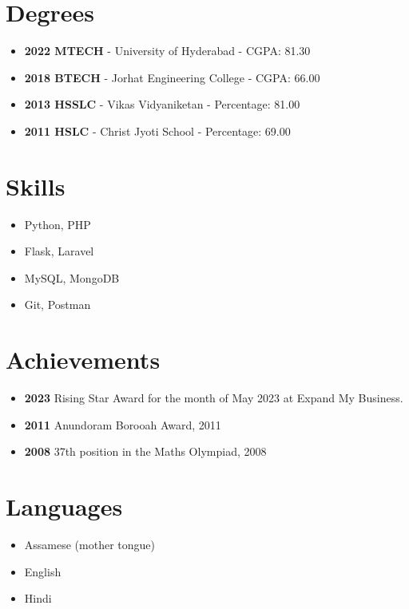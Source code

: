 \documentclass[10pt,a4paper]{article}
\begin{document}
\begin{paracol}{2}
\begin{leftcolumn}
\section*{Degrees}
\textcolor{textgrey}{
\begin{itemize}
    \item \textbf{2022 MTECH} - University of Hyderabad - CGPA: 81.30
    \item \textbf{2018 BTECH} - Jorhat Engineering College - CGPA: 66.00
    \item \textbf{2013 HSSLC} - Vikas Vidyaniketan - Percentage: 81.00
    \item \textbf{2011 HSLC} - Christ Jyoti School - Percentage: 69.00
\end{itemize}
}

\section*{Skills}
\textcolor{textgrey}{
\begin{itemize}
    \item Python, PHP
    \item Flask, Laravel
    \item MySQL, MongoDB
    \item Git, Postman
\end{itemize}
}

\section*{Achievements}
\textcolor{textgrey}{
\begin{itemize}
    \item \textbf{2023} Rising Star Award for the month of May 2023 at Expand My Business.
    \item \textbf{2011} Anundoram Borooah Award, 2011
    \item \textbf{2008} 37th position in the Maths Olympiad, 2008
\end{itemize}
}

\section*{Languages}
\textcolor{textgrey}{
\begin{itemize}
    \item Assamese (mother tongue)
    \item English
    \item Hindi
\end{itemize}
}


\end{leftcolumn}
\end{paracol}
\end{document}
